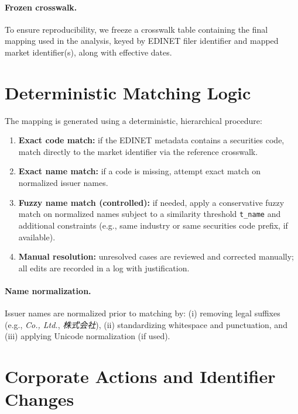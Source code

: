 \paragraph{Frozen crosswalk.}
To ensure reproducibility, we freeze a crosswalk table containing the final mapping used in the analysis, keyed by EDINET filer identifier and mapped market identifier(s), along with effective dates.

\section{Deterministic Matching Logic}
\label{appendix:matching_logic}

The mapping is generated using a deterministic, hierarchical procedure:

\begin{enumerate}
  \item \textbf{Exact code match:} if the EDINET metadata contains a securities code, match directly to the market identifier via the reference crosswalk.
  \item \textbf{Exact name match:} if a code is missing, attempt exact match on normalized issuer names.
  \item \textbf{Fuzzy name match (controlled):} if needed, apply a conservative fuzzy match on normalized names subject to a similarity threshold \texttt{t\_name} and additional constraints (e.g., same industry or same securities code prefix, if available).
  \item \textbf{Manual resolution:} unresolved cases are reviewed and corrected manually; all edits are recorded in a log with justification.
\end{enumerate}

\paragraph{Name normalization.}
Issuer names are normalized prior to matching by: (i) removing legal suffixes (e.g., \emph{Co., Ltd.}, \emph{株式会社}), (ii) standardizing whitespace and punctuation, and (iii) applying Unicode normalization (if used).

\section{Corporate Actions and Identifier Changes}
\label{appendix:corp_actions}

